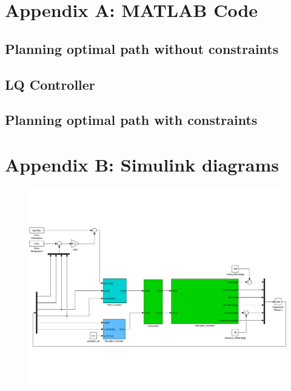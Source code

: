 \begin{appendices}

\section{Appendix A: MATLAB Code}

\label{appendix:A}



\subsection{Planning optimal path without constraints}





\subsection{LQ Controller}





\subsection{Planning optimal path with constraints}









\section{Appendix B: Simulink diagrams}

\label{appendix:B}



\begin{figure}[h]

    \includegraphics[width=\textwidth]{ex3sim.pdf}


\end{figure}
\end{appendices}
